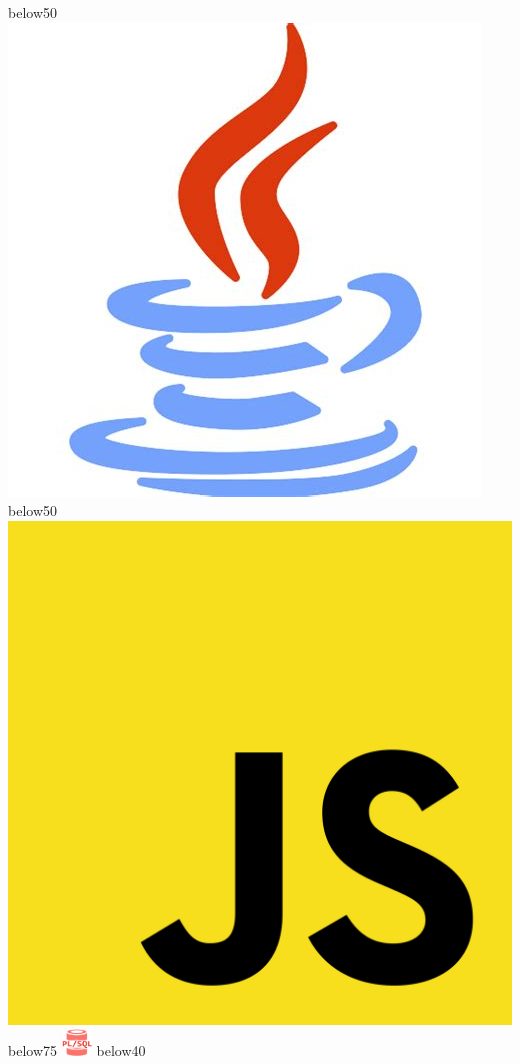 \documentclass[blue]{pastelcv}              %
\begin{document}
\begin{paracol}{2}
  {}{below}{50}
  {\large\bf \includegraphics[width=\iconsizep]{java} }
  {}{below}{50}
  {\large\bf \includegraphics[width=\iconsizep]{js}}
  {}{below}{75}
  {\large\bf \includegraphics[width=8mm]{pl-sql}}
  {}{below}{40}
\vspace{0.5em}


\end{paracol}
\end{document}
